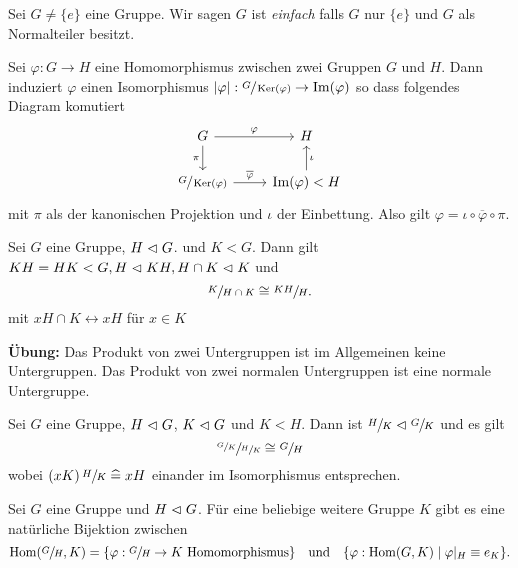 \begin{definition}
	Sei $G \neq \{e\} $ eine Gruppe. Wir sagen $ G$ ist \emph{einfach} falls $G$ nur $\{e\} $ und $G$ als Normalteiler besitzt.
\end{definition}



\begin{theorem}
	Sei $\varphi: G \to H$ eine Homomorphismus zwischen zwei Gruppen $G$ und $H$.
	Dann induziert $\varphi$ einen Isomorphismus $\abs{\varphi}: \sfrac{G}{\operatorname{Ker}(\varphi)} \to  \Im(\varphi)$ so dass 
	folgendes Diagram komutiert
	\[
	\begin{tikzcd}
		G \arrow[d, "\pi"'] \arrow[r, "\varphi"]                 & H                                    \\
	\sfrac{G}{\ker(\varphi)} \arrow[r, "\overline{\varphi}"] & \Im(\varphi) < H \arrow[u, "\iota"']
		\end{tikzcd}
	\] 
	mit $\pi$ als der kanonischen Projektion und $\iota$ der Einbettung.
	Also gilt $\varphi = \iota \circ \overline{\varphi} \circ \pi$.
\end{theorem}



\begin{corollary}
	Sei $G$ eine Gruppe, $H \vartriangleleft G$. und $K < G$.
	Dann gilt $K H = H K < G, H \vartriangleleft KH, H \cap K \vartriangleleft K $ und 
	\[
	\sfrac{K}{H \cap K} \cong \sfrac{KH}{H}
	.\] 
	mit $x H \cap K \leftrightarrow x H$ für $x \in K$
\end{corollary}


\textbf{Übung:}
 Das Produkt von zwei Untergruppen ist im Allgemeinen keine Untergruppen.
 Das Produkt von zwei normalen Untergruppen ist eine normale Untergruppe.

 \begin{corollary}
 	Sei $G$ eine Gruppe, $H \vartriangleleft G$, $K \vartriangleleft G$ und $K < H$.
	Dann ist $\sfrac{H}{K} \vartriangleleft \sfrac{G}{K}$ und es gilt
	\[
	\sfrac{\sfrac{G}{K}}{\sfrac{H}{K}} \cong \sfrac{G}{H}
	\] 
	wobei $(xK) \, \sfrac{H}{K} \; \widehat{=} \; x H$ einander im Isomorphismus entsprechen.
 \end{corollary}


\begin{corollary}
	Sei $G$ eine Gruppe und $H \vartriangleleft G$.
	Für eine beliebige weitere Gruppe $K$ gibt es eine natürliche Bijektion zwischen 
	\[
		\hom(\sfrac{G}{H},K) = \{ \varphi: \sfrac{G}{H} \to K \text{ Homomorphismus}\} \qq{und} \{\varphi: \hom(G,K) \mid \varphi \vert_{H} \equiv e_{K}\} 
	.\] 
\end{corollary}

